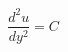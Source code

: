 \documentclass[preview,border=2pt]{standalone}
\begin{document}
\[
\frac{d^{2}u}{dy^{2}} = C
\]
\end{document}

